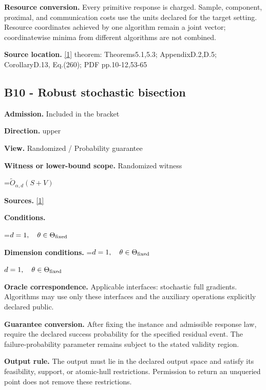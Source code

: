 \documentclass[10pt,a4paper]{article}
\newcommand{\AtlasMath}[1]{\par\begingroup\centering\setbox0=\hbox{$\displaystyle #1$}\ifdim\wd0>1.4\linewidth\typeout{ATLAS WIDE FORMULA: \the\wd0}\fi\ifdim\wd0>\linewidth\resizebox{\linewidth}{!}{\box0}\else\box0\fi\par\endgroup}
\newcommand{\AtlasInlineMath}[1]{\begingroup\setbox0=\hbox{$#1$}\ifdim\wd0>.4\linewidth\endgroup\AtlasMath{#1}\else\endgroup$#1$\fi}
\begin{document}
\textbf{Resource conversion.} Every primitive response is charged. Sample, component, proximal, and communication costs use the units declared for the target setting. Resource coordinates achieved by one algorithm remain a joint vector; coordinatewise minima from different algorithms are not combined.



\textbf{Source location.} \href{https://arxiv.org/pdf/2609.03990}{[1]} theorem: Theorems5.1,5.3; AppendixD.2,D.5; CorollaryD.13, Eq.(260); PDF pp.10-12,53-65



\subsection{B10 - Robust stochastic bisection}


\textbf{Admission.} Included in the bracket



\textbf{Direction.} upper



\textbf{View.} Randomized / Probability guarantee



\textbf{Witness or lower-bound scope.} Randomized witness



\AtlasMath{\widetilde{O}_{\alpha,d}(S+V)}


\textbf{Sources.} \href{https://arxiv.org/pdf/2609.03990}{[1]}



\textbf{Conditions.}
\AtlasMath{d=1,\quad\theta\in\Theta_{\rm fixed}}




\textbf{Dimension conditions.} \AtlasInlineMath{d=1,\quad\theta\in\Theta_{\rm fixed}}



\textbf{Oracle correspondence.} Applicable interfaces: stochastic full gradients. Algorithms may use only these interfaces and the auxiliary operations explicitly declared public.



\textbf{Guarantee conversion.} After fixing the instance and admissible response law, require the declared success probability for the specified residual event. The failure-probability parameter remains subject to the stated validity region.



\textbf{Output rule.} The output must lie in the declared output space and satisfy its feasibility, support, or atomic-hull restrictions. Permission to return an unqueried point does not remove these restrictions.
\end{document}
